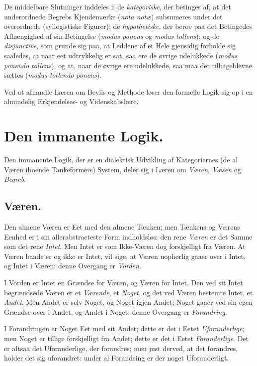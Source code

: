 \documentclass[12pt]{book}
\begin{document}
De middelbare Slutninger inddeles i: de \emph{kategoriske}, der betinges
af, at det underordnede Begrebs Kjendemærke (\textit{nota notæ}) subsumeres
under det overordnede (syllogistiske Figurer); de \emph{hypothetiske},
der beroe paa det Betingedes Afhængighed af sin Betingelse
(\textit{modus ponens} og \textit{modus tollens}); og de \emph{disjunctive}, som grunde
sig paa, at Leddene af et Hele gjensidig forholde sig saaledes, at naar
eet udtrykkelig er sat, saa ere de øvrige udelukkede (\textit{modus ponendo tollens}),
og at, naar de øvrige ere udelukkede, saa maa det tilbageblevne
sættes (\textit{modus tollendo ponens}).

Ved at afhandle Læren om Beviis og Methode løser den formelle
Logik sig op i en almindelig Erkjendelses- og Videnskabslære.

\section*{Den immanente Logik.}

Den immanente Logik, der er en dialektisk Udvikling af Kategoriernes
(de al Væren iboende Tankeformers) System, deler sig i Læren
om \emph{Væren}, \emph{Væsen} og \emph{Begreb}.

\subsection*{Væren.}

Den almene Væren er Eet med den almene Tænken; men Tænkens
og Værens Eenhed er i sin allerabstracteste Form indholdsløs: den
rene \emph{Væren} er det Samme som det rene \emph{Intet}. Men Intet er som
Ikke-Væren dog forskjelligt fra Væren. At Væren baade er og ikke er
Intet, vil sige, at Væren uophørlig gaaer over i Intet, og Intet i
Væren: denne Overgang er \emph{Vorden}.

I Vorden er Intet en Grændse for Væren, og Væren for Intet.
Den ved sit Intet begrændsede Væren er et \emph{Værende}, et \emph{Noget}, og
det ved Væren bestemte Intet, et \emph{Andet}. Men Andet er selv Noget,
og Noget igjen Andet; Noget gaaer ved sin egen Grændse over i Andet,
og Andet i Noget: denne Overgang er \emph{Forandring}.

I Forandringen er Noget Eet med sit Andet; dette er det i Eetet
\emph{Uforanderlige}; men Noget er tillige forskjelligt fra Andet; dette er
det i Eetet \emph{Foranderlige}. Det er altsaa det Uforanderlige, der
forandres; meu just derved, at det forandres, holder det sig uforandret:
under al Forandring er der noget Uforanderligt.
\end{document}
